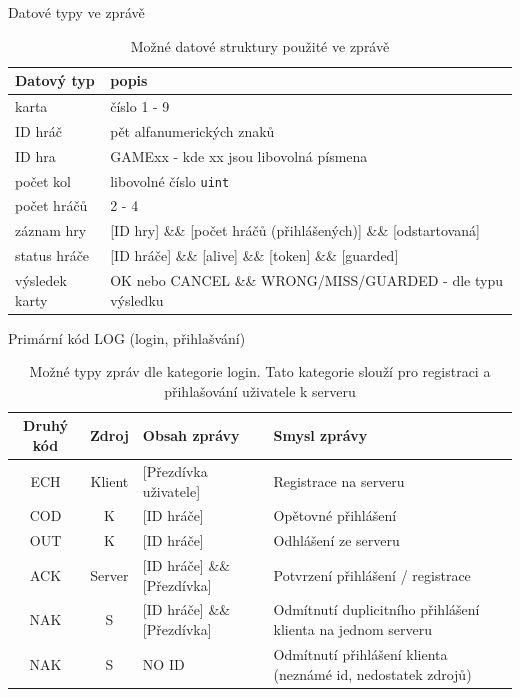 \documentclass[12pt, a4paper]{article}
\begin{document}
\begin{table}[H]%
\centering
Datové typy ve zprávě
\begin{tabular}{| p{3cm} | p{10cm} |}
\hline
Datový typ &  popis\\
\hline
karta & číslo 1 - 9 \\
\hline
ID hráč & pět alfanumerických znaků\\
\hline
ID hra & GAMExx - kde xx jsou libovolná písmena \\
\hline
počet kol & libovolné číslo \texttt{uint}  \\
\hline
počet hráčů & 2 - 4 \\
\hline
záznam hry & [ID hry]    \&\&    [počet hráčů (přihlášených)]    \&\&    [odstartovaná] \\
\hline
status hráče & [ID hráče]    \&\&    [alive]    \&\&   [token]    \&\&    [guarded]  \\
\hline
výsledek karty & OK nebo CANCEL \&\& WRONG/MISS/GUARDED - dle typu výsledku\\
\hline
\end{tabular}
\label{tab:zpravyDatTypy}
\caption{Možné datové struktury použité ve zprávě}
\end{table}


\begin{table}[H]%
\centering
Primární kód LOG (login, přihlašvání)
\begin{tabular}{|c | c | p{4cm} | p{5cm} |}
\hline
Druhý kód &  Zdroj & Obsah zprávy & Smysl zprávy\\
\hline
ECH & Klient & [Přezdívka uživatele] & Registrace na serveru \\
\hline
COD & K &[ID hráče] & Opětovné přihlášení\\
\hline
OUT & K &[ID hráče] & Odhlášení ze serveru \\
\hline
ACK & Server &[ID hráče]    \&\&    [Přezdívka] & Potvrzení přihlášení / registrace \\
\hline
NAK & S &[ID hráče]    \&\&    [Přezdívka] & Odmítnutí duplicitního přihlášení klienta na jednom serveru \\
\hline
NAK & S &NO ID & Odmítnutí přihlášení klienta (neznámé id, nedostatek zdrojů) \\
\hline
\end{tabular}
\label{tab:zpravyLOGServer}
\caption{Možné typy zpráv dle kategorie login. Tato kategorie slouží pro registraci a přihlašování uživatele k serveru}
\end{table}
\end{document}
